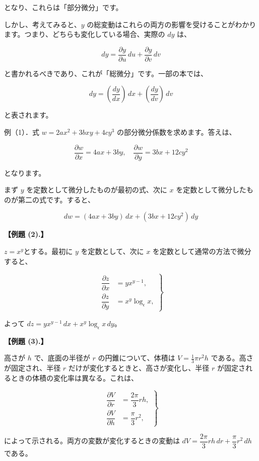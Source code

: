 \documentclass[a4paper,11pt,openany]{ltjsbook}
\begin{document}
となり、これらは「部分微分」です。

しかし、考えてみると、$y$ の総変動はこれらの両方の影響を受けることがわかります。つまり、どちらも変化している場合、実際の $dy$ は、

\[
dy = \frac{\partial y}{\partial u} \, du + \frac{\partial y}{\partial v} \, dv
\]

と書かれるべきであり、これが「総微分」です。一部の本では、

\[
dy = \left( \frac{dy}{dx} \right) \, dx + \left( \frac{dy}{dv} \right) \, dv
\]

と表されます。

例（1）．式 $w = 2ax^2 + 3bxy + 4cy^3$ の部分微分係数を求めます。答えは、

\[
\frac{\partial w}{\partial x} = 4ax + 3by, \quad \frac{\partial w}{\partial y} = 3bx + 12cy^2
\]

となります。

まず $y$ を定数として微分したものが最初の式、次に $x$ を定数として微分したものが第二の式です。すると、

\[
dw = (4ax + 3by) \, dx + (3bx + 12cy^2) \, dy
\]

\par\textbf{【例題 (2).】}\par \( z = x^y \)とする。最初に \( y \) を定数として、次に \( x \) を定数として通常の方法で微分すると、

\[
\left.
\begin{aligned}
\dfrac{\partial z}{\partial x} &= yx^{y-1}, \\
\dfrac{\partial z}{\partial y} &= x^y \log_\epsilon x,
\end{aligned}\right\}
\]

よって \( dz = yx^{y-1} \, dx + x^y \log_\epsilon x \, dy \)。

\par\textbf{【例題 (3).】}\par 高さが \( h \) で、底面の半径が \( r \) の円錐について、体積は \( V = \frac{1}{3} \pi r^2 h \) である。高さが固定され、半径 \( r \) だけが変化するときと、高さが変化し、半径 \( r \) が固定されるときの体積の変化率は異なる。これは、

\[
\left.
\begin{aligned}
\dfrac{\partial V}{\partial r} &= \dfrac{2\pi}{3} rh, \\
\dfrac{\partial V}{\partial h} &= \dfrac{\pi}{3} r^2,
\end{aligned}\right\}
\]

によって示される。両方の変数が変化するときの変動は \( dV = \dfrac{2\pi}{3} rh \, dr + \dfrac{\pi}{3} r^2 \, dh \) である。
\end{document}
